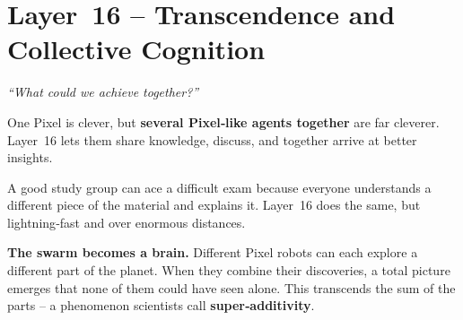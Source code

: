 \section{Layer~16 – Transcendence and Collective Cognition}
\label{sec:layer16}

\begin{tcolorbox}[colback=blue!5, colframe=blue!60, title=\textbf{Superpower: The Hive‑Mind}]
\begin{center}
\textit{“What could we achieve together?”}
\end{center}
\end{tcolorbox}

One Pixel is clever, but \textbf{several Pixel‑like agents together}
are far cleverer.  Layer~16 lets them share knowledge, discuss, and
together arrive at better insights.

\begin{tcolorbox}[colback=yellow!5, colframe=yellow!80, title=Real‑life analogy]
A good study group can ace a difficult exam because everyone
understands a different piece of the material and explains it.
Layer~16 does the same, but lightning‑fast and over enormous
distances.
\end{tcolorbox}

\textbf{The swarm becomes a brain.}
Different Pixel robots can each explore a different part of the planet.
When they combine their discoveries, a total picture emerges that none
of them could have seen alone.  This transcends the sum of the parts –
a phenomenon scientists call \textbf{super‑additivity}.